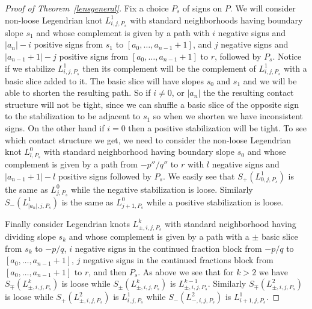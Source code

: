 \documentclass[11pt]{amsart}
\theoremstyle{plain}
\theoremstyle{definition}
\theoremstyle{remark}
\numberwithin{theorem}{section}
\begin{document}
\begin{proof}[Proof of Theorem~\ref{lensgeneral}]
Fix a choice $P_s$ of signs on $P$. We will consider non-loose Legendrian knot $L^1_{i,j,P_s}$ with standard neighborhoods having boundary slope $s_1$ and whose complement is given by a path with $i$ negative signs and $|a_n|-i$ positive signs from $s_1$ to $[a_0,\ldots, a_{n-1}+1]$, and $j$ negative signs and $|a_{n-1}+1|-j$ positive signs from $[a_0,\ldots, a_{n-1}+1]$ to $r$, followed by $P_s$. Notice if we stabilize $L^1_{i,j,P_s}$ then its complement will be the complement of $L^1_{i,j,P_s}$ with a basic slice added to it. The basic slice will have slopes $s_0$ and $s_1$ and we will be able to shorten the resulting path. So if $i\not=0$, or $|a_n|$ the the resulting contact structure will not be tight, since we can shuffle a basic slice of the opposite sign to the stabilization to be adjacent to $s_1$ so when we shorten we have inconsistent signs. On the other hand if $i=0$ then a positive stabilization will be tight. To see which contact structure we get, we need to consider the non-loose Legendrian knot $L^0_{l,P_s}$ with standard neighborhood having boundary slope $s_0$ and whose complement is given by a path from $-p''/q''$ to $r$ with $l$ negative signs and $|a_{n-1}+1|-l$ positive signs followed by $P_s$. We easily see that $S_+(L^1_{0,j,P_s})$ is the same as $L^0_{j,P_s}$ while the negative stabilization is loose. Similarly $S_-(L^1_{|a_n|, j,P_s})$ is the same as $L^0_{j+1,P_s}$ while a positive stabilization is loose. 

Finally consider Legendrian knots $L^k_{\pm,i,j,P_s}$ with standard neighborhood having dividing slope $s_k$ and whose complement is given by a path with a $\pm$ basic slice from $s_k$ to $-p/q$, $i$ negative signs in the continued fraction block from $-p/q$ to $[a_0,\ldots, a_{n-1}+1]$, $j$ negative signs in the continued fractions block from $[a_0,\ldots, a_{n-1}+1]$ to $r$, and then $P_s$. As above we see that for $k>2$ we have $S_\mp(L^k_{\pm,i,j,P_s})$ is loose while $S_\pm(L^k_{\pm,i,j,P_s})$ is $L^{k-1}_{\pm,i,j,P_s}$. Similarly $S_\mp(L^2_{\pm,i,j,P_s})$ is loose while $S_+(L^2_{\pm, i,j,P_s})$ is $L^1_{i,j,P_s}$ while $S_-(L^2_{-,i,j,P_s})$ is $L^1_{i+1,j,P_s}$. 


\end{proof}
\end{document}
